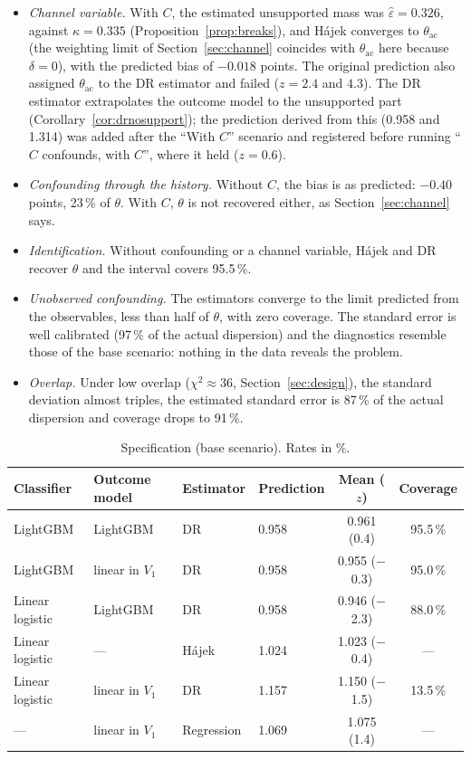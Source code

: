 \documentclass[twoside,11pt]{article}
\newcommand{\thac}{\theta_{\mathrm{ac}}}
\theoremstyle{plain}
\theoremstyle{definition}
\begin{document}
\begin{itemize}
  \item \emph{Channel variable.} With $C$, the estimated unsupported mass was $\hat\varepsilon=0.326$, against $\kappa=0.335$ (Proposition~\ref{prop:breaks}), and Hájek converges to $\thac$ (the weighting limit of Section~\ref{sec:channel} coincides with $\thac$ here because $\delta=0$), with the predicted bias of $-0.018$ points. The original prediction also assigned $\thac$ to the DR estimator and failed ($z=2.4$ and $4.3$). The DR estimator extrapolates the outcome model to the unsupported part (Corollary~\ref{cor:drnosupport}); the prediction derived from this (0.958 and 1.314) was added after the ``With $C$'' scenario and registered before running ``$C$ confounds, with $C$'', where it held ($z=0.6$).
  \item \emph{Confounding through the history.} Without $C$, the bias is as predicted: $-0.40$ points, 23\,\% of $\theta$. With $C$, $\theta$ is not recovered either, as Section~\ref{sec:channel} says.
  \item \emph{Identification.} Without confounding or a channel variable, Hájek and DR recover $\theta$ and the interval covers 95.5\,\%.
  \item \emph{Unobserved confounding.} The estimators converge to the limit predicted from the observables, less than half of $\theta$, with zero coverage. The standard error is well calibrated (97\,\% of the actual dispersion) and the diagnostics resemble those of the base scenario: nothing in the data reveals the problem.
  \item \emph{Overlap.} Under low overlap ($\chi^2\approx36$, Section~\ref{sec:design}), the standard deviation almost triples, the estimated standard error is 87\,\% of the actual dispersion and coverage drops to 91\,\%.
\end{itemize}

\begin{table}[ht]
\centering\small
\caption{Specification (base scenario). Rates in \%.}\label{tab:specification}
\begin{tabular}{@{}llllcc@{}}
\toprule
Classifier & Outcome model & Estimator & Prediction & Mean ($z$) & Coverage \\
\midrule
LightGBM & LightGBM & DR & 0.958 & 0.961 (0.4) & 95.5\,\% \\
LightGBM & linear in $V_1$ & DR & 0.958 & 0.955 ($-$0.3) & 95.0\,\% \\
Linear logistic & LightGBM & DR & 0.958 & 0.946 ($-$2.3) & 88.0\,\% \\
Linear logistic & --- & Hájek & 1.024 & 1.023 ($-$0.4) & --- \\
Linear logistic & linear in $V_1$ & DR & 1.157 & 1.150 ($-$1.5) & 13.5\,\% \\
--- & linear in $V_1$ & Regression & 1.069 & 1.075 (1.4) & --- \\
\bottomrule
\end{tabular}
\end{table}
\end{document}
